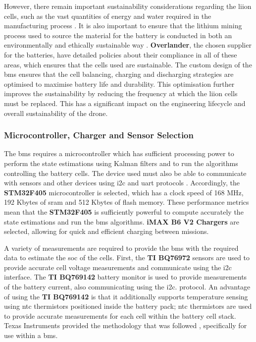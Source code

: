 However, there remain important sustainability considerations regarding the \acrshort{liion} cells, such as the vast quantities of energy and water required in the manufacturing process \cite{environments12010024}. It is also important to ensure that the lithium mining process used to source the material for the battery is conducted in both an environmentally and ethically sustainable way \cite{EnergyFuturesLab_2022}. \textbf{Overlander}, the chosen supplier for the batteries, have detailed policies about their compliance in all of these areas, which ensures that the cells used are sustainable. The custom design of the \gls{bms} ensures that the cell balancing, charging and discharging strategies are optimised to maximise battery life and durability. This optimisation further improves the sustainability by reducing the frequency at which the \acrshort{liion} cells must be replaced. This has a significant impact on the engineering lifecycle and overall sustainability of the drone.

\subsubsection{Microcontroller, Charger and Sensor Selection}
\label{microcon}

The \acrshort{bms} requires a microcontroller which has sufficient processing power to perform the state estimations using Kalman filters and to run the algorithms controlling the battery cells. The device used must also be able to communicate with sensors and other devices using \gls{i2c} and \gls{uart} protocols \cite{Denggao2022}. Accordingly, the \textbf{STM32F405} microcontroller is selected, which has a clock speed of 168 MHz, 192 Kbytes of \gls{sram} and 512 Kbytes of flash memory. These performance metrics mean that the \textbf{STM32F405} is sufficiently powerful to compute accurately the state estimations and run the \acrshort{bms} algorithms. \textbf{iMAX B6 V2 Chargers} are selected, allowing for quick and efficient charging between missions.

A variety of measurements are required to provide the \acrshort{bms} with the required data to estimate the \gls{soc} of the cells. First, the \textbf{TI BQ76972} sensors are used to provide accurate cell voltage measurements and communicate using the \acrshort{i2c} interface. The \textbf{TI BQ769142} battery monitor is used to provide measurements of the battery current, also communicating using the \acrshort{i2c}. protocol. An advantage of using the \textbf{TI BQ769142} is that it additionally supports temperature sensing using \gls{ntc} thermistors positioned inside the battery pack; \gls{ntc} thermistors are used to provide accurate measurements for each cell within the battery cell stack. Texas Instruments provided the methodology that was followed \cite{TI_SNIA032}, specifically for use within a \gls{bms}.

